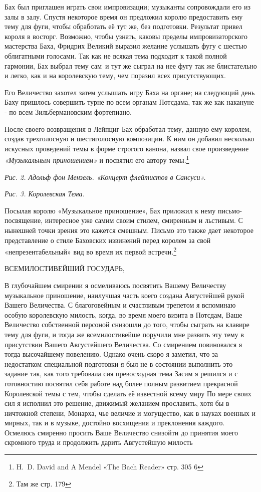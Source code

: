 \documentclass[../main.tex]{subfiles}
\begin{document}
Бах был приглашен играть свои импровизации; музыканты сопровождали его из залы в залу. Спустя некоторое время он предложил королю предоставить ему тему для фуги, чтобы обработать её тут же, без подготовки. Результат привел короля в восторг. Возможно, чтобы узнать, каковы пределы импровизаторского мастерства Баха, Фридрих Великий выразил желание услышать фугу с шестью облигатными голосами. Так как не всякая тема подходит к такой полной гармонии, Бах выбрал тему сам~и тут же сыграл на нее фугу так же блистательно и легко, как и на королевскую тему, чем поразил всех присутствующих.

Его Величество захотел затем услышать игру Баха на органе; на следующий день Баху пришлось совершить турне по всем органам Потсдама, так же как накануне - по всем Зильбермановским фортепиано.

После своего возвращения в Лейпциг Бах обработал тему, данную ему королем, создав трехголосную и шестиголосную композиции. К ним он добавил несколько искусных проведений темы в форме строгого канона, назвал свое произведение \emph{«Музыкальным приношением»} и посвятил его автору темы.\footnote{H.~D. David and A Mendel «The Bach Reader» стр. 305 6}

\emph{Рис. 2. Адольф фон Мензель. «Концерт флейтистов в Сансуси».}

\emph{Рис. 3. Королевская Тема.}

Посылая королю «Музыкальное приношение», Бах приложил к нему письмо-посвящение, интересное уже самим своим стилем, смиренным и льстивым. С нынешней точки зрения это кажется смешным. Письмо это также дает некоторое представление о стиле Баховских извинений перед королем за свой «непрезентабельный» вид во время их первой встречи.\footnote{Там же стр. 179}

ВСЕМИЛОСТИВЕЙШИЙ ГОСУДАРЬ,

В глубочайшем смирении я осмеливаюсь посвятить Вашему Величеству музыкальное приношение, наилучшая часть коего создана Августейшей рукой Вашего Величества. С благоговейным и счастливым трепетом я вспоминаю особую королевскую милость, когда, во время моего визита в Потсдам, Ваше Величество собственной персоной снизошли до того, чтобы сыграть на клавире тему для фуги, и тогда же всемилостивейше поручили мне развить эту тему в присутствии Вашего Августейшего Величества. Со смирением повиновался я тогда высочайшему повелению. Однако очень скоро я заметил, что за недостатком специальной подготовки я был не в состоянии выполнить это задание так, как того требовала сия превосходная тема Засим я решился и с готовностию посвятил себя работе над более полным развитием прекрасной Королевской темы с тем, чтобы сделать её известной всему миру По мере своих сил я исполнил это решение, движимый желанием прославить, хотя бы в ничтожной степени, Монарха, чье величие и могущество, как в науках военных и мирных, так и в музыке, достойно восхищения и преклонения каждого. Осмелюсь смиренно просить Ваше Величество снизойти до принятия моего скромного труда и продолжить дарить Августейшую милость
\end{document}
